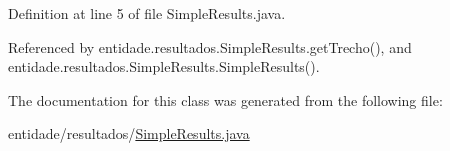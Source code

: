 Definition at line 5 of file Simple\+Results.\+java.



Referenced by entidade.\+resultados.\+Simple\+Results.\+get\+Trecho(), and entidade.\+resultados.\+Simple\+Results.\+Simple\+Results().



The documentation for this class was generated from the following file\+:\begin{DoxyCompactItemize}
\item 
entidade/resultados/\hyperlink{SimpleResults_8java}{Simple\+Results.\+java}\end{DoxyCompactItemize}

